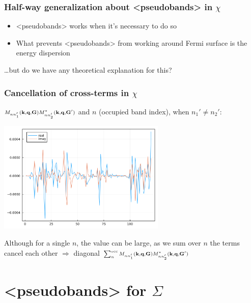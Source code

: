 \documentclass[t]{beamer}
\newcommand{\shortcode}[1]{\texttt{#1}}
\def\texttt#1{<#1>}%
\begin{document}
\begin{frame}
\frametitle{Half-way generalization about \shortcode{pseudobands} in $\chi$}

\begin{itemize}
    \item[\faHandPointRight] \shortcode{pseudobands} works  
    when it's necessary to do so 
    \item[\faHandPointRight] What prevents \shortcode{pseudobands} from working 
    around Fermi surface is the energy dispersion
\end{itemize}

\vspace{0.5cm}

\dots but do we have any theoretical explanation for this?

\end{frame}

\begin{frame}
\frametitle{Cancellation of cross-terms in $\chi$}

$\scriptstyle M_{n n'_1} (\vb{k}, \vb{q}, \vb{G}) M^*_{nn'_2} (\vb{k}, \vb{q}, \vb{G}')$ and $n$ (occupied band index), when $n_1' \neq n_2'$:
\begin{center}
    \includegraphics[width=0.6\textwidth]{../data/chi/nc-n1-2000-n2-1000-nv-1-120-k_idx-12-q_idx-37-G_idx-200.png}
\end{center}

\faHandPointRight Although for a single $n$, the value can be large, 
as we sum over $n$ the terms cancel each other $\Rightarrow$
diagonal $\scriptstyle \sum_{n}^{\text{occ}} M_{n n'_1} (\vb{k}, \vb{q}, \vb{G}) M^*_{nn'_2} (\vb{k}, \vb{q}, \vb{G}')$ 

\end{frame}


\section{\shortcode{pseudobands} for $\Sigma$}
\end{document}
